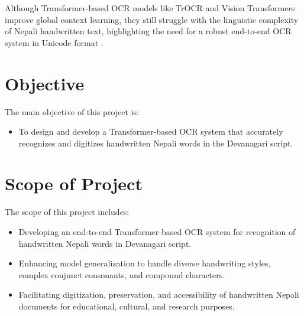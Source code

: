 Although Transformer-based OCR models like TrOCR and Vision Transformers improve global context learning, they still struggle with the linguistic complexity of Nepali handwritten text, highlighting the need for a robust end-to-end OCR system in Unicode format \cite{hasan2023optical,parres2023fine,li2025htr}.

      \section{Objective} 
The main objective of this project is:
\begin{itemize}
    \item To design and develop a Transformer-based OCR system that accurately recognizes and digitizes handwritten Nepali words in the Devanagari script.
\end{itemize}

\section{Scope of Project}
The scope of this project includes:
\begin{itemize}
    \item Developing an end-to-end Transformer-based OCR system for recognition of handwritten Nepali words in Devanagari script.
    \item Enhancing model generalization to handle diverse handwriting styles, complex conjunct consonants, and compound characters.
    \item Facilitating digitization, preservation, and accessibility of handwritten Nepali documents for educational, cultural, and research purposes.
\end{itemize}
    
    